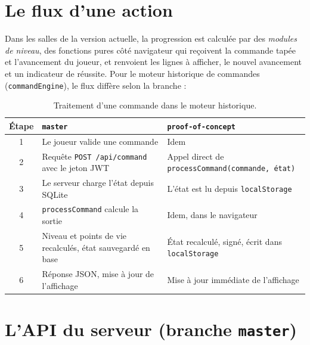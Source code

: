 \documentclass[11pt,a4paper]{report}
\newcommand{\code}[1]{\texttt{\nolinkurl{#1}}}
\begin{document}
\section{Le flux d'une action}

Dans les salles de la version actuelle, la progression est calcul\'ee par des
\emph{modules de niveau}, des fonctions pures c\^ot\'e navigateur qui re\c coivent la
commande tap\'ee et l'avancement du joueur, et renvoient les lignes \`a afficher, le nouvel
avancement et un indicateur de r\'eussite. Pour le moteur historique de commandes
(\code{commandEngine}), le flux diff\`ere selon la branche :

\begin{table}[H]
\centering
\small
\begin{tabularx}{\textwidth}{@{}clX@{}}
\toprule
\textbf{\'Etape} & \textbf{\code{master}} & \textbf{\code{proof-of-concept}} \\
\midrule
1 & Le joueur valide une commande & Idem \\
2 & Requ\^ete \texttt{POST /api/command} avec le jeton JWT & Appel direct de \texttt{processCommand(commande, état)} \\
3 & Le serveur charge l'\'etat depuis SQLite & L'\'etat est lu depuis \texttt{localStorage} \\
4 & \texttt{processCommand} calcule la sortie & Idem, dans le navigateur \\
5 & Niveau et points de vie recalcul\'es, \'etat sauvegard\'e en base & \'Etat recalcul\'e, sign\'e, \'ecrit dans \texttt{localStorage} \\
6 & R\'eponse JSON, mise \`a jour de l'affichage & Mise \`a jour imm\'ediate de l'affichage \\
\bottomrule
\end{tabularx}
\caption{Traitement d'une commande dans le moteur historique.}
\end{table}

\section{L'API du serveur (branche \texttt{master})}
\end{document}

